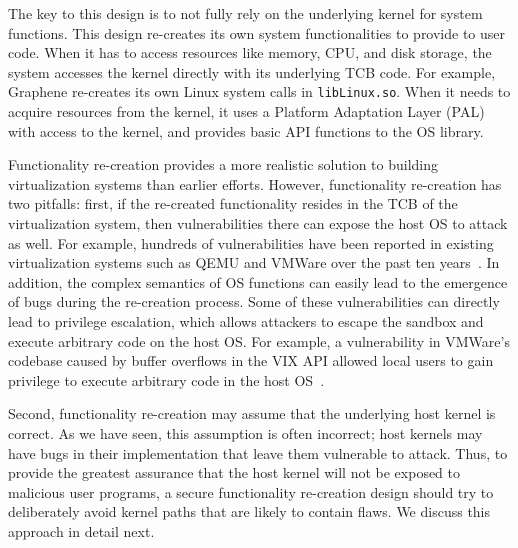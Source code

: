 
The key to this design is to not fully rely on the underlying
kernel for system functions. 
This design re-creates its own system functionalities to provide to user code.
When it has to %
access resources like memory, CPU, and disk storage, the system accesses the kernel directly with
its underlying TCB code.
For example, Graphene \cite{Graphene-14} re-creates its own Linux system calls
in \texttt{libLinux.so}. When it needs to acquire resources from the kernel, it
uses a Platform Adaptation Layer (PAL) with access to the kernel, and provides
basic API functions to the OS library.

Functionality re-creation provides a more realistic solution to building
virtualization systems than earlier efforts.
However, functionality re-creation has two pitfalls: 
first, if the re-created functionality resides in the TCB of the virtualization system, then vulnerabilities there can expose the host OS to attack as well.
For example, hundreds of vulnerabilities have been
reported in existing virtualization systems such as QEMU and VMWare over the past ten years~\cite{NVD}.
In addition, the
complex semantics of OS functions can easily lead to the emergence of bugs during
the re-creation process. Some of these vulnerabilities
can directly lead to privilege escalation, which allows attackers to escape the sandbox
and execute arbitrary code on the host OS.
For example, a vulnerability in VMWare's codebase caused by buffer overflows in the VIX
API allowed local users to
gain privilege to execute arbitrary code in the host
OS~\cite{CVE-2008-2100}.

Second, functionality re-creation may assume that the underlying host kernel is correct. 
As we have seen, this assumption is often incorrect; host kernels may have bugs in their implementation that leave them vulnerable to attack. 
Thus, to provide the greatest assurance that the host kernel will not be exposed to malicious user programs, 
a secure functionality re-creation design should try to deliberately avoid kernel paths that are likely to contain flaws. 
We discuss this approach in detail next.

